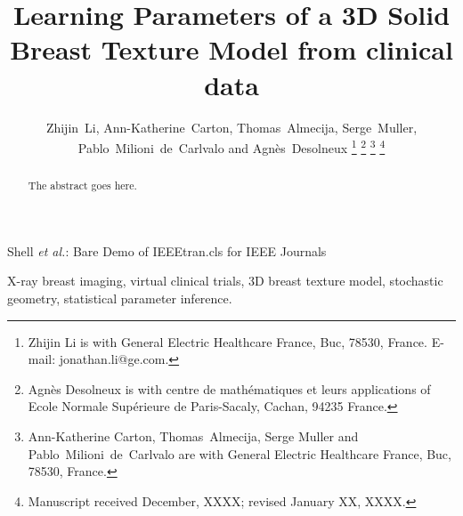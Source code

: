 \documentclass[journal]{IEEEtran}
\begin{document}
\title{Learning Parameters of a 3D Solid Breast Texture Model from
  clinical data} %

\author{Zhijin~Li, Ann-Katherine~Carton, Thomas~Almecija,
  Serge~Muller, Pablo~Milioni~de~Carlvalo and
  Agnès~Desolneux%
  \thanks{Zhijin Li is with General Electric Healthcare France, Buc,
    78530, France. E-mail:
    jonathan.li@ge.com.}%
  \thanks{Agnès Desolneux is with centre de math\'{e}matiques et leurs
    applications of Ecole Normale Sup\'{e}rieure de Paris-Sacaly,
    Cachan, 94235 France.}%
  \thanks{Ann-Katherine Carton, Thomas~Almecija, Serge Muller and
    Pablo~Milioni~de~Carlvalo are with General Electric Healthcare
    France, Buc, 78530, France.}%
  \thanks{Manuscript received December, XXXX; revised January XX,
    XXXX.}}

%
{Shell \MakeLowercase{\textit{et al.}}: Bare Demo of IEEEtran.cls for
  IEEE Journals}
%



\maketitle

\begin{abstract}
  The abstract goes here.
\end{abstract}

\begin{IEEEkeywords}
  X-ray breast imaging, virtual clinical trials, 3D breast texture
  model, stochastic geometry, statistical parameter inference.
\end{IEEEkeywords}
\end{document}
